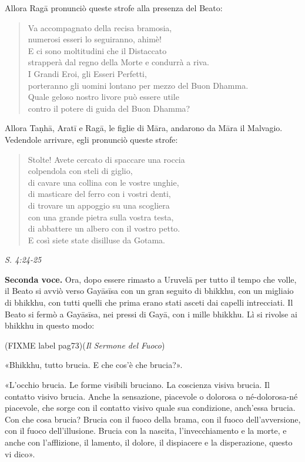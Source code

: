 Allora Ragā pronunciò queste strofe alla presenza del Beato:


\begin{quotation}
Va accompagnato della recisa bramosia, \\
numerosi esseri lo seguiranno, ahimè! \\
E ci sono moltitudini che il Distaccato \\
strapperà dal regno della Morte e condurrà a riva. \\
I Grandi Eroi, gli Esseri Perfetti, \\
porteranno gli uomini lontano per mezzo del Buon Dhamma. \\
Quale geloso nostro livore può essere utile \\
contro il potere di guida del Buon Dhamma?
\end{quotation}

Allora Taṇhā, Aratī e Ragā, le figlie di Māra, andarono da Māra il
Malvagio. Vedendole arrivare, egli pronunciò queste strofe:


\begin{quotation}
Stolte! Avete cercato di spaccare una roccia \\
colpendola con steli di giglio, \\
di cavare una collina con le vostre unghie, \\
di masticare del ferro con i vostri denti, \\
di trovare un appoggio su una scogliera \\
con una grande pietra sulla vostra testa, \\
di abbattere un albero con il vostro petto. \\
E così siete state disilluse da Gotama.
\end{quotation}

\emph{S. 4:24-25}


\textbf{Seconda voce.} Ora, dopo essere rimasto a Uruvelā per tutto il tempo che
volle, il Beato si avviò verso Gayāsīsa con un gran seguito di bhikkhu,
con un migliaio di bhikkhu, con tutti quelli che prima erano stati
asceti dai capelli intrecciati. Il Beato si fermò a Gayāsīsa, nei pressi
di Gayā, con i mille bhikkhu. Lì si rivolse ai bhikkhu in questo modo:


(FIXME label pag73)(\emph{Il Sermone del Fuoco})


«Bhikkhu, tutto brucia. E che cos’è che brucia?».


«L’occhio brucia. Le forme visibili bruciano. La coscienza visiva
brucia. Il contatto visivo brucia. Anche la sensazione, piacevole o
dolorosa o né-dolorosa-né piacevole, che sorge con il contatto visivo
quale sua condizione, anch’essa brucia. Con che cosa brucia? Brucia con
il fuoco della brama, con il fuoco dell’avversione, con il fuoco
dell’illusione. Brucia con la nascita, l’invecchiamento e la morte, e
anche con l’afflizione, il lamento, il dolore, il dispiacere e la
disperazione, questo vi dico».


